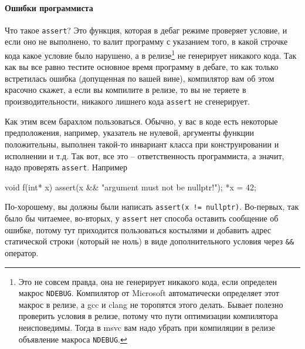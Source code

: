 \documentclass{article}
\begin{document}
\paragraph{Ошибки программиста}

Что такое \verb"assert"? Это функция, которая в дебаг режиме проверяет условие, и если оно не выполнено, то валит программу с указанием того, в какой строчке кода какое условие было нарушено, а в релизе\footnote{Это не совсем правда, она не генерирует никакого кода, если определен макрос \verb"NDEBUG". Компилятор от Microsoft автоматически определяет этот макрос в релизе, а gcc и clang не торопятся этого делать. Бывает полезно проверить условия в релизе, потому что пути оптимизации компилятора неисповедимы. Тогда в msvc вам надо убрать при компиляции в релизе объявление макроса \verb"NDEBUG".} не генерирует никакого кода. Так как вы все равно тестите основное время программу в дебаге, то как только встретилась ошибка (допущенная по вашей вине), компилятор вам об этом красочно скажет, а если вы компилите в релизе, то вы не теряете в производительности, никакого лишнего кода \verb"assert" не сгенерирует.

Как этим всем барахлом пользоваться. Обычно, у вас в коде есть некоторые предположения, например, указатель не нулевой, аргументы функции положительны, выполнен такой-то инвариант класса при конструировании и исполнении и т.д. Так вот, все это -- ответственность программиста, а значит, надо проверять \verb"assert". Например
\begin{cppcode}
void f(int* x) {
  assert(x && "argument must not be nullptr!");
  *x = 42;
}
\end{cppcode}
По-хорошему, вы должны были написать \verb"assert(x != nullptr)". Во-первых, так было бы читаемее, во-вторых, у \verb"assert" нет способа оставить сообщение об ошибке, потому тут приходится пользоваться костылями и добавить адрес статической строки (который не ноль) в виде дополнительного условия через \verb"&&" оператор.
\end{document}
